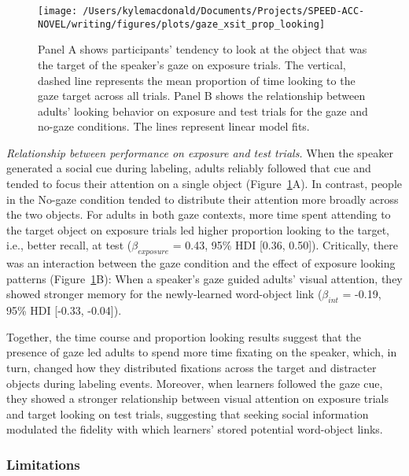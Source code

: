 \documentclass[man,floatsintext]{apa6}
\begin{document}
\begin{figure}[!t]

{\centering \texttt{[image: /Users/kylemacdonald/Documents/Projects/SPEED-ACC-NOVEL/writing/figures/plots/gaze\_xsit\_prop\_looking]} 

}

\caption{Panel A shows participants’ tendency to look at the object that was the target of the speaker’s gaze on exposure trials. The vertical, dashed line represents the mean proportion of time looking to the gaze target across all trials. Panel B shows the relationship between adults' looking behavior on exposure and test trials for the gaze and no-gaze conditions. The lines represent linear model fits.}\label{fig:gaze-xsit-prop-looking-plot}
\end{figure}

\emph{Relationship between performance on exposure and test trials.}
When the speaker generated a social cue during labeling, adults reliably
followed that cue and tended to focus their attention on a single object
(Figure~\ref{fig:gaze-xsit-prop-looking-plot}A). In contrast, people in
the No-gaze condition tended to distribute their attention more broadly
across the two objects. For adults in both gaze contexts, more time
spent attending to the target object on exposure trials led higher
proportion looking to the target, i.e., better recall, at test
(\(\beta_{exposure}\) = 0.43, 95\% HDI {[}0.36, 0.50{]}). Critically,
there was an interaction between the gaze condition and the effect of
exposure looking patterns
(Figure~\ref{fig:gaze-xsit-prop-looking-plot}B): When a speaker's gaze
guided adults' visual attention, they showed stronger memory for the
newly-learned word-object link (\(\beta_{int}\) = -0.19, 95\% HDI
{[}-0.33, -0.04{]}).

Together, the time course and proportion looking results suggest that
the presence of gaze led adults to spend more time fixating on the
speaker, which, in turn, changed how they distributed fixations across
the target and distracter objects during labeling events. Moreover, when
learners followed the gaze cue, they showed a stronger relationship
between visual attention on exposure trials and target looking on test
trials, suggesting that seeking social information modulated the
fidelity with which learners' stored potential word-object links.

\subsubsection{Limitations}\label{limitations}
\end{document}

